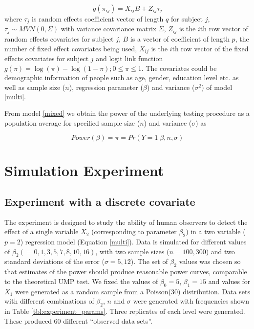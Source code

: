 \documentclass{article}
\begin{document}
\begin{equation}
g(\pi_{ij}) = X_{ij}B  + Z_{ij} \tau_j 
\label{mixed} 
\end{equation}
%
where $\tau_j$ is random effects coefficient vector of length $q$ for subject $j$,  $\tau_j  \sim  MVN(0,\Sigma)$ with variance covariance matrix $\Sigma$, $Z_{ij}$ is the $i$th row vector of random effects covariates for subject $j$, $B$ is a vector of coefficient of length $p$, the number of fixed effect covariates being used, $X_{ij}$ is the $i$th row vector of the fixed effects covariates for subject $j$ and logit link function $g(\pi)=\log(\pi) - \log(1-\pi); 0 \le \pi \le 1$. The covariates could be demographic information of people such as age, gender, education level etc. as well as sample size ($n$), regression parameter ($\beta$) and variance ($\sigma^2$) of model \ref{multi}. 

From model \ref{mixed} we obtain %
the power of the underlying testing procedure as a population average %
for specified sample size ($n$) and  variance ($\sigma$)  as 

\begin{equation}\label{eqn:power} 
Power(\beta) = \pi=Pr(Y=1|\beta, n, \sigma) 
\end{equation}


\section{Simulation Experiment} \label{sec:simulation}

\subsection{Experiment with a discrete covariate}

The experiment is designed to study the ability of human observers to detect the effect of a single variable $X_2$ (corresponding to parameter $\beta_2$) in a two variable ($p=2$) regression model (Equation \eqref{multi}). Data is simulated for different values of $\beta_2 (=0, 1, 3, 5, 7, 8, 10, 16)$, with two sample sizes ($n=100, 300$) and two standard deviations of the error ($\sigma=5, 12$). The set of $\beta_2$ values was chosen so that estimates of the power should produce reasonable power curves, comparable to the theoretical UMP test. We fixed the values of $\beta_0 = 5$,  $\beta_1=15$ and values for $X_1$ were generated as a random sample from a Poisson(30) distribution. Data sets with different combinations of $\beta_2$,  $n$ and $\sigma$ were generated with frequencies shown in Table \ref{tbl:experiment_params}. Three replicates of each level were generated. These produced 60 different ``observed data sets''. 
\end{document}

